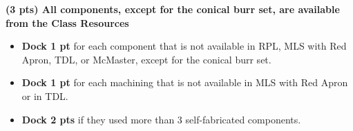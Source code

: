\documentclass[11pt]{article}
\begin{document}
\textbf{(3 pts) All components, except for the conical burr set, are available from the Class Resources} 

\begin{itemize}
  \item \textbf{Dock 1 pt} for each component that is not available in RPL, MLS with Red Apron, TDL, or McMaster, except for the conical burr set. 
  \item \textbf{Dock 1 pt} for each machining that is not available in MLS with Red Apron or in TDL. 
  \item \textbf{Dock 2 pts} if they used more than 3 self-fabricated components. 
\end{itemize}
\end{document}
